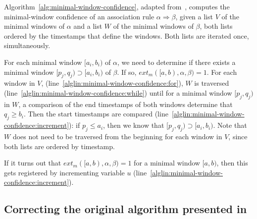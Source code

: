 Algorithm~\ref{alg:minimal-window-confidence}, adapted from~\citep{cule2014marbles}, computes the minimal-window confidence of an association rule $ \alpha \Rightarrow \beta $, given a list $ V $ of the minimal windows of $ \alpha $ and a list $ W $ of the minimal windows of $ \beta $, both lists ordered by the timestamps that define the windows. Both lists are iterated once, simultaneously.

For each minimal window $ [a_i, b_i) $ of $ \alpha $, we need to determine if there exists a minimal window $ [p_j, q_j) \supset [a_i, b_i) $ of $ \beta $. If so, $ ext_m([a, b), \alpha, \beta) = 1 $. For each window in $ V $, (line~\ref{alglin:minimal-window-confidence:for}), $ W $ is traversed (line~\ref{alglin:minimal-window-confidence:while}) until for a minimal window $ [p_j, q_j) $ in $ W $, a comparison of the end timestamps of both windows determine that $ q_j \geq b_i $. Then the start timestamps are compared (line~\ref{alglin:minimal-window-confidence:increment}): if $ p_j \leq a_i $, then we know that $ [p_j, q_j) \supset [a_i, b_i) $. Note that $ W $ does not need to be traversed from the beginning for each window in $ V $, since both lists are ordered by timestamp.

If it turns out that $ ext_m([a, b), \alpha, \beta) = 1 $ for a minimal window $ [a, b) $, then this gets registered by incrementing variable $ u $ (line~\ref{alglin:minimal-window-confidence:increment}).

\iffalse
\begin{figure}
\centering

\begin{tikzpicture}

\sequencetickmarks{15}{0}{0}

\foreach \x in {0,0.5,...,7}
    \draw [gray,ultra thin] (\x,2) -- (\x,-15pt);

\draw [very thick] (2.5,10pt) ++(0,-3pt) -- ++(0,3pt) -- ++(1.9,0) -- +(0,-3pt);
\windowthingy{(1,-5pt)}{5}
\windowthingy{(2,-10pt)}{6}

\end{tikzpicture}

\caption{Finding a minimal window of $ \beta $ that contains a given minimal window of $ \alpha $ (drawn above the sequence tick marks in bold).}
\label{fig:minimal-window-confidence}
\end{figure}
\fi

\subsection{Correcting the original algorithm presented in~\cite{cule2014marbles}}

